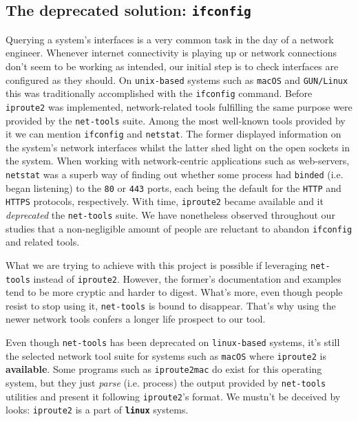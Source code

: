         \subsection{The deprecated solution: \texttt{ifconfig}}
            Querying a system's interfaces is a very common task in the day of a network engineer. Whenever internet connectivity is playing up or network connections don't seem to be working as intended, our initial step is to check interfaces are configured as they should. On \texttt{unix-based} systems such as \texttt{macOS} and \texttt{GUN/Linux} this was traditionally accomplished with the \texttt{ifconfig} command. Before \texttt{iproute2} was implemented, network-related tools fulfilling the same purpose were provided by the \texttt{net-tools} suite. Among the most well-known tools provided by it we can mention \texttt{ifconfig} and \texttt{netstat}. The former displayed information on the system's network interfaces whilst the latter shed light on the open sockets in the system. When working with network-centric applications such as web-servers, \texttt{netstat} was a superb way of finding out whether some process had \texttt{binded} (i.e. began listening) to the \texttt{80} or \texttt{443} ports, each being the default for the \texttt{HTTP} and \texttt{HTTPS} protocols, respectively. With time, \texttt{iproute2} became available and it \textit{deprecated} the \texttt{net-tools} suite. We have nonetheless observed throughout our studies that a non-negligible amount of people are reluctant to abandon \texttt{ifconfig} and related tools.

            What we are trying to achieve with this project is possible if leveraging \texttt{net-tools} instead of \texttt{iproute2}. However, the former's documentation and examples tend to be more cryptic and harder to digest. What's more, even though people resist to stop using it, \texttt{net-tools} is bound to disappear. That's why using the newer network tools confers a longer life prospect to our tool.

            Even though \texttt{net-tools} has been deprecated on \texttt{linux-based} systems, it's still the selected network tool suite for systems such as \texttt{macOS} where \texttt{iproute2} is \textbf{available}. Some programs such as \texttt{iproute2mac} do exist for this operating system, but they just \textit{parse} (i.e. process) the output provided by \texttt{net-tools} utilities and present it following \texttt{iproute2}'s format. We mustn't be deceived by looks: \texttt{iproute2} is a part of \textbf{\texttt{linux}} systems.


